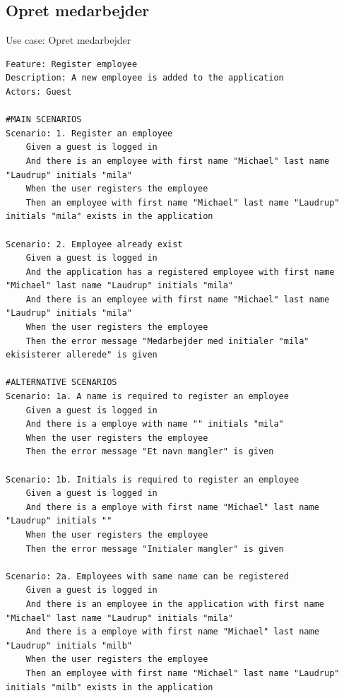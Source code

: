 \subsection{Opret medarbejder}
\begin{listing}[H]
    \centering
    \caption{Use case: Opret medarbejder}\label{lst:usecase_register_employee}
    \begin{verbatim}  
Feature: Register employee
Description: A new employee is added to the application
Actors: Guest

#MAIN SCENARIOS
Scenario: 1. Register an employee
    Given a guest is logged in
    And there is an employee with first name "Michael" last name "Laudrup" initials "mila"  
    When the user registers the employee
    Then an employee with first name "Michael" last name "Laudrup" initials "mila" exists in the application

Scenario: 2. Employee already exist
    Given a guest is logged in
    And the application has a registered employee with first name "Michael" last name "Laudrup" initials "mila"
    And there is an employee with first name "Michael" last name "Laudrup" initials "mila"
    When the user registers the employee
    Then the error message "Medarbejder med initialer "mila" ekisisterer allerede" is given

#ALTERNATIVE SCENARIOS
Scenario: 1a. A name is required to register an employee
    Given a guest is logged in
    And there is a employe with name "" initials "mila"  
    When the user registers the employee
    Then the error message "Et navn mangler" is given

Scenario: 1b. Initials is required to register an employee
    Given a guest is logged in
    And there is a employe with first name "Michael" last name "Laudrup" initials ""
    When the user registers the employee
    Then the error message "Initialer mangler" is given

Scenario: 2a. Employees with same name can be registered
    Given a guest is logged in
    And there is an employee in the application with first name "Michael" last name "Laudrup" initials "mila"
    And there is a employe with first name "Michael" last name "Laudrup" initials "milb"  
    When the user registers the employee
    Then an employee with first name "Michael" last name "Laudrup" initials "milb" exists in the application

    \end{verbatim}
\end{listing}

